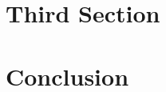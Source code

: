 \documentclass[conference]{templates/IEEEtran}
\begin{document}
	\lipsum[5]

\section{Third Section}

	\lipsum[6]

\section{Conclusion} %

	\lipsum[7]

\clearpage
{} %
\nocite{*} %


\end{document}
